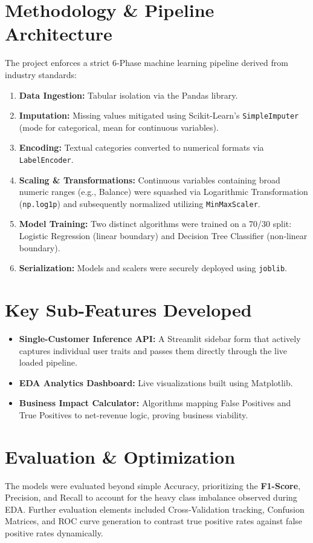 \documentclass[a4paper,12pt]{article}
\begin{document}
\section{Methodology \& Pipeline Architecture}
The project enforces a strict 6-Phase machine learning pipeline derived from industry standards:
\begin{enumerate}
    \item \textbf{Data Ingestion:} Tabular isolation via the Pandas library.
    \item \textbf{Imputation:} Missing values mitigated using Scikit-Learn's \texttt{SimpleImputer} (mode for categorical, mean for continuous variables).
    \item \textbf{Encoding:} Textual categories converted to numerical formats via \texttt{LabelEncoder}.
    \item \textbf{Scaling \& Transformations:} Continuous variables containing broad numeric ranges (e.g., Balance) were squashed via Logarithmic Transformation (\texttt{np.log1p}) and subsequently normalized utilizing \texttt{MinMaxScaler}.
    \item \textbf{Model Training:} Two distinct algorithms were trained on a 70/30 split: Logistic Regression (linear boundary) and Decision Tree Classifier (non-linear boundary).
    \item \textbf{Serialization:} Models and scalers were securely deployed using \texttt{joblib}.
\end{enumerate}

\section{Key Sub-Features Developed}
\begin{itemize}
    \item \textbf{Single-Customer Inference API:} A Streamlit sidebar form that actively captures individual user traits and passes them directly through the live loaded pipeline.
    \item \textbf{EDA Analytics Dashboard:} Live visualizations built using Matplotlib.
    \item \textbf{Business Impact Calculator:} Algorithms mapping False Positives and True Positives to net-revenue logic, proving business viability.
\end{itemize}

\section{Evaluation \& Optimization}
The models were evaluated beyond simple Accuracy, prioritizing the \textbf{F1-Score}, Precision, and Recall to account for the heavy class imbalance observed during EDA. Further evaluation elements included Cross-Validation tracking, Confusion Matrices, and ROC curve generation to contrast true positive rates against false positive rates dynamically.
\end{document}
